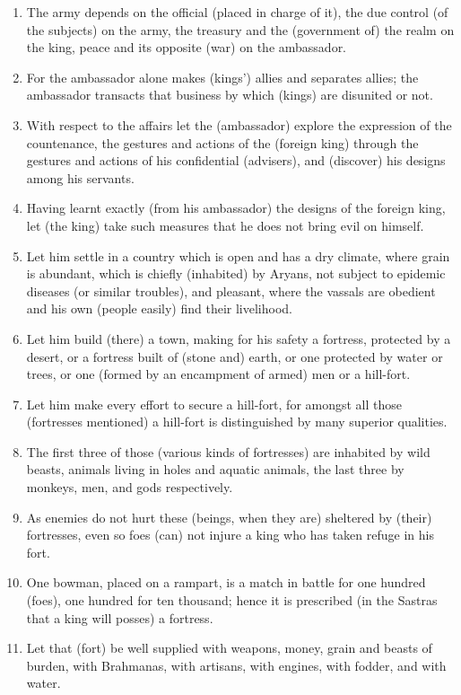 \begin{enumerate}
\item The army depends on the official (placed in charge of it), the due control (of the subjects) on the army, the treasury and the (government of) the realm on the king, peace and its opposite (war) on the ambassador.
\item For the ambassador alone makes (kings') allies and separates allies; the ambassador transacts that business by which (kings) are disunited or not.
\item With respect to the affairs let the (ambassador) explore the expression of the countenance, the gestures and actions of the (foreign king) through the gestures and actions of his confidential (advisers), and (discover) his designs among his servants.
\item Having learnt exactly (from his ambassador) the designs of the foreign king, let (the king) take such measures that he does not bring evil on himself.
\item Let him settle in a country which is open and has a dry climate, where grain is abundant, which is chiefly (inhabited) by Aryans, not subject to epidemic diseases (or similar troubles), and pleasant, where the vassals are obedient and his own (people easily) find their livelihood.
\item Let him build (there) a town, making for his safety a fortress, protected by a desert, or a fortress built of (stone and) earth, or one protected by water or trees, or one (formed by an encampment of armed) men or a hill-fort.
\item Let him make every effort to secure a hill-fort, for amongst all those (fortresses mentioned) a hill-fort is distinguished by many superior qualities.
\item The first three of those (various kinds of fortresses) are inhabited by wild beasts, animals living in holes and aquatic animals, the last three by monkeys, men, and gods respectively.
\item As enemies do not hurt these (beings, when they are) sheltered by (their) fortresses, even so foes (can) not injure a king who has taken refuge in his fort.
\item One bowman, placed on a rampart, is a match in battle for one hundred (foes), one hundred for ten thousand; hence it is prescribed (in the Sastras that a king will posses) a fortress.
\item Let that (fort) be well supplied with weapons, money, grain and beasts of burden, with Brahmanas, with artisans, with engines, with fodder, and with water.

\end{enumerate}
